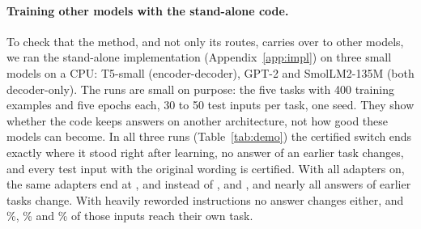 \paragraph{Training other models with the stand-alone code.} To check that the method, and not
only its routes, carries over to other models, we ran the stand-alone implementation
(Appendix~\ref{app:impl}) on three small models on a CPU: T5-small (encoder-decoder), GPT-2 and
SmolLM2-135M (both decoder-only). The runs are small on purpose: the five tasks with 400 training
examples and five epochs each, 30 to 50 test inputs per task, one seed. They show whether the code
keeps answers on another architecture, not how good these models can become. In all three runs
(Table~\ref{tab:demo}) the certified switch ends exactly where it stood right after learning, no
answer of an earlier task changes, and every test input with the original wording is certified. With
all adapters on, the same adapters end at \DemoTfivePlainAP{}, \DemoGptPlainAP{} and
\DemoSmolPlainAP{} instead of \DemoTfiveAP{}, \DemoGptAP{} and \DemoSmolAP{}, and nearly all answers of
earlier tasks change. With heavily reworded instructions no answer changes either, and
\DemoTfiveHeavyRight{}\%, \DemoGptHeavyRight{}\% and \DemoSmolHeavyRight{}\% of those inputs reach
their own task.

\begin{table}[t]
  \caption{The stand-alone implementation on three small models (CPU, five tasks, 400 training
  examples and 5 epochs per task, one seed). ``Changed'': answers of the first four tasks that
  differ at the end. ``Certified'': test inputs with the original wording that are inside a zone.
  ``enc.-dec.'': encoder-decoder; ``dec.-only'': decoder-only.}
  \label{tab:demo}
  \centering
  \footnotesize
  \setlength{\tabcolsep}{3pt}
  
\end{table}

